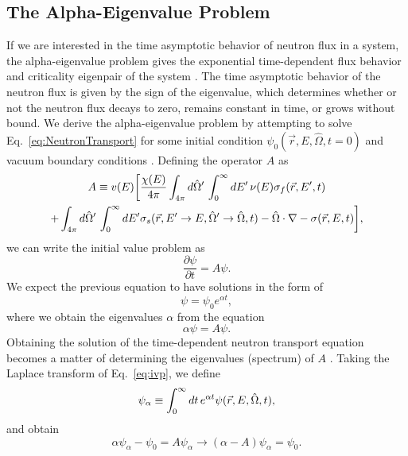 \subsection{The Alpha-Eigenvalue Problem}
If we are interested in the time asymptotic behavior of neutron flux in a system, the alpha-eigenvalue problem gives the exponential time-dependent flux behavior and criticality eigenpair of the system \cite{bell_nuclear_1970}. The time asymptotic behavior of the neutron flux is given by the sign of the eigenvalue, which determines whether or not the neutron flux decays to zero, remains constant in time, or grows without bound. We derive the alpha-eigenvalue problem by attempting to solve Eq.~\ref{eq:NeutronTransport} for some initial condition $\psi_{0}(\vec{r},E,\hat{\Omega},t=0)$ and vacuum boundary conditions \cite{lewis_computational_1984}. Defining the operator $A$ as
\begin{multline}
A \equiv v(E) \bigg [ \frac{\chi(E)}{4\pi} \int_{4\pi} \mathop{}\!d \hat{\Omega}' \, \int_{0}^{\infty} \mathop{}\!d E' \, \nu(E) \sigma_{f}(\vec{r},E',t) \\ +\int_{4\pi} \mathop{}\!d \hat{\Omega}' \, \int_{0}^{\infty} \mathop{}\!d E' \sigma_{s}(\vec{r},E'\rightarrow E, \hat{\Omega}' \rightarrow \hat{\Omega},t) - \hat{\Omega} \cdot \nabla - \sigma(\vec{r},E,t) \bigg ],
\end{multline}
we can write the initial value problem as 
\begin{equation}
\frac{\partial \psi}{\partial t} = A \psi.
\label{eq:ivp}
\end{equation}
We expect the previous equation to have solutions in the form of
\begin{equation}
		\psi = \psi_{0} e^{\alpha t},
\end{equation}
where we obtain the eigenvalues $\alpha$ from the equation
\begin{equation}
\alpha \psi = A \psi.
\label{eq:ivp_A}
	\end{equation}
Obtaining the solution of the time-dependent neutron transport equation becomes a matter of determining the eigenvalues (spectrum) of $A$ \cite{bell_nuclear_1970}. Taking the Laplace transform of Eq.~\ref{eq:ivp}, we define
\begin{equation}
	\psi_{\alpha} \equiv \int_{0}^{\infty} \mathop{}\!d t \, e^{\alpha t} \psi(\vec{r},E,\hat{\Omega},t), 
\end{equation}
and obtain
\begin{equation}
	\alpha \psi_{\alpha} - \psi_{0} = A \psi_{\alpha} \rightarrow (\alpha - A) \psi_{\alpha} = \psi_{0}.	\end{equation}

